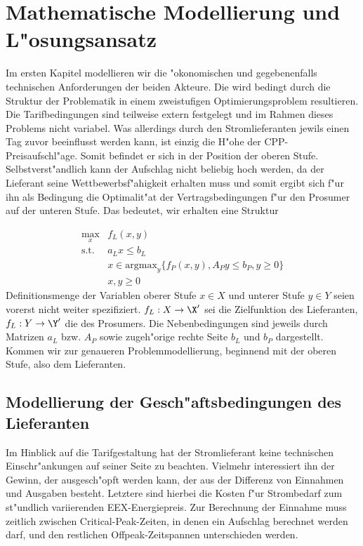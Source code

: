\section{Mathematische Modellierung und L"osungsansatz}
Im ersten Kapitel modellieren wir die "okonomischen und gegebenenfalls technischen Anforderungen der beiden Akteure. Die wird bedingt durch die Struktur der Problematik in einem zweistufigen Optimierungsproblem resultieren. Die Tarifbedingungen sind teilweise extern festgelegt und im Rahmen dieses Problems nicht variabel. Was allerdings durch den Stromlieferanten jewils einen Tag zuvor beeinflusst werden kann, ist einzig die H"ohe der CPP-Preisaufschl"age. Somit befindet er sich in der Position der oberen Stufe. Selbstverst"andlich kann der Aufschlag nicht beliebig hoch werden, da der Lieferant seine Wettbewerbsf"ahigkeit erhalten muss und somit ergibt sich f"ur ihn als Bedingung die Optimalit"at der Vertragsbedingungen f"ur den Prosumer auf der unteren Stufe. Das bedeutet, wir erhalten eine Struktur 

\begin{align*}
\max_{x} & f_L(x,y)\\
\text{s.t.} & a_Lx \leq b_L\\
& x \in \text{argmax}_y \{f_P(x,y), A_Py \leq b_P, y \geq 0\}\\
& x,y \geq 0
\end{align*}
Definitionsmenge der Variablen oberer Stufe $x \in X$ und unterer Stufe $y \in Y$ seien vorerst nicht weiter spezifiziert. $f_L:X \rightarrow \X'$ sei die Zielfunktion des Lieferanten, $f_L:Y \rightarrow \Y'$
die des Prosumers. Die Nebenbedingungen sind jeweils durch Matrizen $a_L$ bzw. $A_P$ sowie zugeh"orige rechte Seite $b_L$ und $b_P$ dargestellt. 
Kommen wir zur genaueren Problemmodellierung, beginnend mit der oberen Stufe, also dem Lieferanten.
\subsection{Modellierung der Gesch"aftsbedingungen des Lieferanten}
Im Hinblick auf die Tarifgestaltung hat der Stromlieferant keine technischen Einschr"ankungen auf seiner Seite zu beachten. Vielmehr interessiert ihn der Gewinn, der ausgesch"opft werden kann, der aus der Differenz von Einnahmen und Ausgaben besteht. Letztere sind hierbei die Kosten f"ur Strombedarf zum st"undlich variierenden EEX-Energiepreis. Zur Berechnung der Einnahme muss zeitlich zwischen Critical-Peak-Zeiten, in denen ein Aufschlag berechnet werden darf, und den restlichen Offpeak-Zeitspannen unterschieden werden. 

